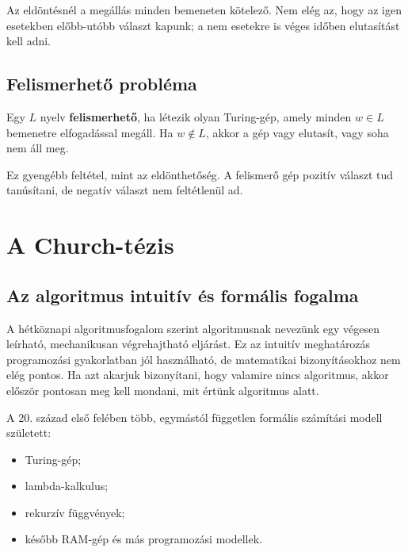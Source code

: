 \begin{summarybox}
Az eldöntésnél a megállás minden bemeneten kötelező. Nem elég az, hogy az igen esetekben előbb-utóbb választ kapunk; a nem esetekre is véges időben elutasítást kell adni.
\end{summarybox}

\subsection{Felismerhető probléma}

Egy $L$ nyelv \textbf{felismerhető}, ha létezik olyan Turing-gép, amely minden $w\in L$ bemenetre elfogadással megáll. Ha $w\notin L$, akkor a gép vagy elutasít, vagy soha nem áll meg.

Ez gyengébb feltétel, mint az eldönthetőség. A felismerő gép pozitív választ tud tanúsítani, de negatív választ nem feltétlenül ad.

\begin{center}

\end{center}

\section{A Church-tézis}

\subsection{Az algoritmus intuitív és formális fogalma}

A hétköznapi algoritmusfogalom szerint algoritmusnak nevezünk egy végesen leírható, mechanikusan végrehajtható eljárást. Ez az intuitív meghatározás programozási gyakorlatban jól használható, de matematikai bizonyításokhoz nem elég pontos. Ha azt akarjuk bizonyítani, hogy valamire nincs algoritmus, akkor először pontosan meg kell mondani, mit értünk algoritmus alatt.

A 20. század első felében több, egymástól független formális számítási modell született:

\begin{itemize}
  \item Turing-gép;
  \item lambda-kalkulus;
  \item rekurzív függvények;
  \item később RAM-gép és más programozási modellek.
\end{itemize}

